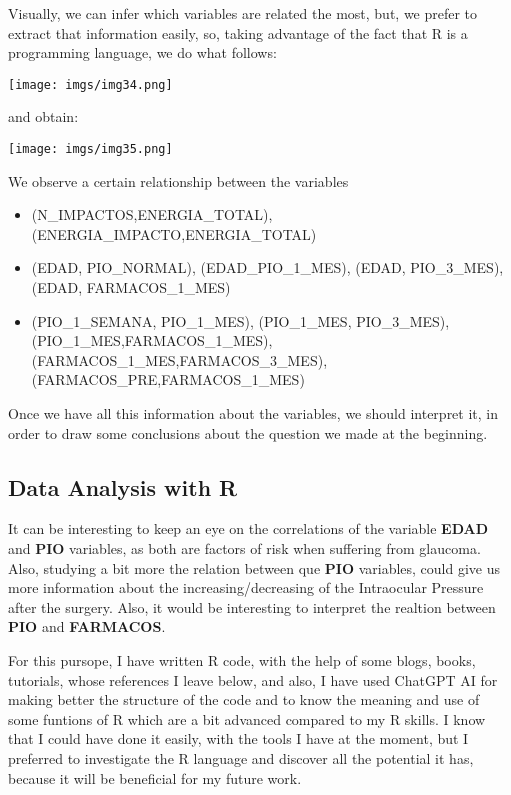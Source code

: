 \documentclass{article}
\begin{document}
Visually, we can infer which variables are related the most, but, we prefer to extract that
information easily, so, taking advantage of the fact that R is a programming language, we do what follows:

\begin{center}
    {\texttt{[image: imgs/img34.png]}\par}
\end{center}

and obtain:

\begin{center}
    {\texttt{[image: imgs/img35.png]}\par}
\end{center}
\hspace{1cm}

We observe a certain relationship between the variables 
\begin{itemize}
    \item (N\_IMPACTOS,ENERGIA\_TOTAL), (ENERGIA\_IMPACTO,ENERGIA\_TOTAL)
    \item (EDAD, PIO\_NORMAL), (EDAD\_PIO\_1\_MES), (EDAD, PIO\_3\_MES), (EDAD, FARMACOS\_1\_MES)
    \item (PIO\_1\_SEMANA, PIO\_1\_MES), (PIO\_1\_MES, PIO\_3\_MES), (PIO\_1\_MES,FARMACOS\_1\_MES), 
    (FARMACOS\_1\_MES,FARMACOS\_3\_MES), (FARMACOS\_PRE,FARMACOS\_1\_MES)
\end{itemize}

Once we have all this information about the variables, we should interpret it, in order to draw some 
conclusions about the question we made at the beginning.

\hspace{1cm}
\subsection{Data Analysis with R}

It can be interesting to keep an eye on the correlations of the variable \textbf{EDAD} and 
\textbf{PIO} variables, as both are factors of risk when suffering from glaucoma. Also, studying 
a bit more the relation between que \textbf{PIO} variables, could give us more information about
the increasing/decreasing of the Intraocular Pressure after the surgery. 
Also, it would be interesting to interpret the realtion between \textbf{PIO} and \textbf{FARMACOS}.

For this pursope, I have written R code, with the help of some blogs, books, tutorials, whose references
I leave below, and also, I have used ChatGPT AI for making better the structure of the code and to know
the meaning and use of some funtions of R which are a bit advanced compared to my R skills. I know that I
could have done it easily, with the tools I have at the moment, but I preferred to investigate the R language 
and discover all the potential it has, because it will be beneficial for my future work.
\end{document}
